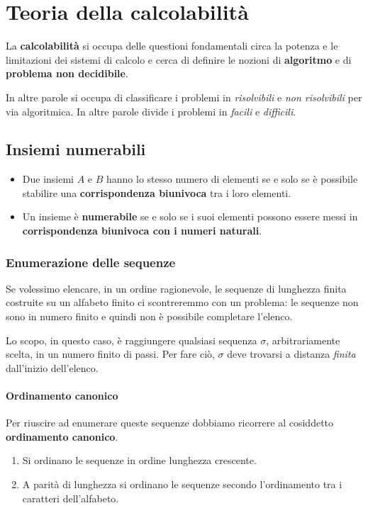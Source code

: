 \chapter{Teoria della calcolabilit\`a}\label{calcolabilita}
La \textbf{calcolabilit\`a} si occupa delle questioni fondamentali circa la potenza e le limitazioni dei sistemi di
calcolo e cerca di definire le nozioni di \textbf{algoritmo} e di \textbf{problema non decidibile}.

In altre parole si occupa di classificare i problemi in \emph{risolvibili} e \emph{non risolvibili} per via algoritmica.
In altre parole divide i problemi in \emph{facili} e \emph{difficili}.


\section{Insiemi numerabili}\label{insiemi_numerabili}
\begin{itemize}
	\item Due insiemi $A$ e $B$ hanno lo stesso numero di elementi se e solo se \`e possibile stabilire una
	      \textbf{corrispondenza biunivoca} tra i loro elementi.
	\item Un insieme \`e \textbf{numerabile} se e solo se i suoi elementi possono essere messi in
	      \textbf{corrispondenza biunivoca con i numeri naturali}.
\end{itemize}

\subsection{Enumerazione delle sequenze}
Se volessimo elencare, in un ordine ragionevole, le sequenze di lunghezza finita costruite su un alfabeto finito ci
scontreremmo con un problema: le sequenze non sono in numero finito e quindi non \`e possibile completare l'elenco.

Lo scopo, in questo caso, \`e raggiungere qualsiasi sequenza $\sigma$, arbitrariamente scelta, in un numero finito di
passi. Per fare ci\`o, $\sigma$ deve trovarsi a distanza \emph{finita} dall'inizio dell'elenco.

\subsubsection{Ordinamento canonico}
Per riuscire ad enumerare queste sequenze dobbiamo ricorrere al cosiddetto \textbf{ordinamento canonico}.
\begin{enumerate}
	\item Si ordinano le sequenze in ordine lunghezza crescente.
	\item A parit\`a di lunghezza si ordinano le sequenze secondo l'ordinamento tra i caratteri dell'alfabeto.
\end{enumerate}

